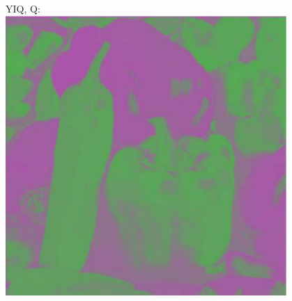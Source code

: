 \documentclass[a4paper,USenglish]{lipics}
\begin{document}
\begin{figure}
\begin{minipage}[b]{0.33\textwidth}
\end{minipage}%
\begin{minipage}[b]{0.33\textwidth}
YIQ, Q:\\
\includegraphics[width=0.95\textwidth]{images/yiqQ2}
\end{minipage}%

\medskip


\end{figure}
\end{document}
